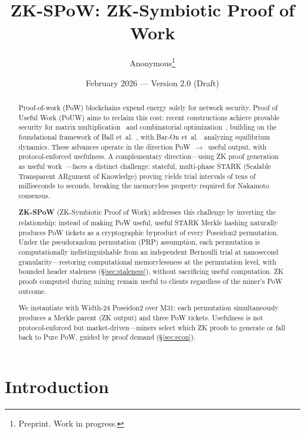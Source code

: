 \documentclass[11pt,a4paper]{article}
\title{\textbf{ZK-SPoW: ZK-Symbiotic Proof of Work}}
\author{Anonymous\thanks{Preprint. Work in progress.}}
\date{February 2026 --- Version 2.0 (Draft)}
\begin{document}
\maketitle

\begin{abstract}
Proof-of-work (PoW) blockchains expend energy solely for network security. Proof of Useful Work (PoUW) aims to reclaim this cost: recent constructions achieve provable security for matrix multiplication~\cite{komargodski2025} and combinatorial optimization~\cite{ofelimos}, building on the foundational framework of Ball et~al.~\cite{ball2017}, with Bar-On et~al.~\cite{baron2025} analyzing equilibrium dynamics. These advances operate in the direction PoW~$\to$~useful output, with protocol-enforced usefulness. A complementary direction---using ZK proof generation as useful work~\cite{oleksak2025}---faces a distinct challenge: stateful, multi-phase STARK (Scalable Transparent ARgument of Knowledge) proving yields trial intervals of tens of milliseconds to seconds, breaking the memoryless property required for Nakamoto consensus.

\textbf{ZK-SPoW} (ZK-Symbiotic Proof of Work) addresses this challenge by inverting the relationship: instead of making PoW useful, useful STARK Merkle hashing naturally produces PoW tickets as a cryptographic byproduct of every Poseidon2 permutation. Under the pseudorandom permutation (PRP) assumption, each permutation is computationally indistinguishable from an independent Bernoulli trial at nanosecond granularity---restoring computational memorylessness at the permutation level, with bounded header staleness (\S\ref{sec:staleness}), without sacrificing useful computation. ZK proofs computed during mining remain useful to clients regardless of the miner's PoW outcome.

We instantiate with Width-24 Poseidon2 over M31: each permutation simultaneously produces a Merkle parent (ZK output) and three PoW tickets. Usefulness is not protocol-enforced but market-driven---miners select which ZK proofs to generate or fall back to Pure PoW, guided by proof demand (\S\ref{sec:econ}).
\end{abstract}

\section{Introduction}
\label{sec:intro}
\end{document}
